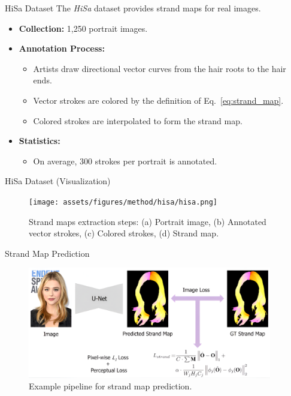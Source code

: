 \begin{frame}[t]{HiSa Dataset}
    The \emph{HiSa} dataset provides strand maps for real images.

    \begin{itemize}
        \item \textbf{Collection:} 1,250 portrait images.
        \item \textbf{Annotation Process:}
        \begin{itemize}
            \item Artists draw directional vector curves from the hair roots to the hair ends.
            \item Vector strokes are colored by the definition of Eq.~\ref{eq:strand_map}.
            \item Colored strokes are interpolated to form the strand map.
        \end{itemize}
        \item \textbf{Statistics:}
        \begin{itemize}
            \item On average, 300 strokes per portrait is annotated.
        \end{itemize}
    \end{itemize}
\end{frame}

\begin{frame}{HiSa Dataset (Visualization)}
    \begin{figure}[t]
        \centering
        \texttt{[image: assets/figures/method/hisa/hisa.png]}
        \caption{Strand maps extraction steps:
        (a) Portrait image, (b) Annotated vector strokes, (c) Colored strokes, (d) Strand map.}
        \label{fig:hisa}
    \end{figure}
\end{frame}

\begin{frame}{Strand Map Prediction}
    \begin{figure}[t]
        \centering
        \includegraphics[width=0.95\textwidth]{assets/figures/method/strand/prediction.png}
        \caption{Example pipeline for strand map prediction.}
        \label{fig:strand-map-prediction}
    \end{figure}
\end{frame}

